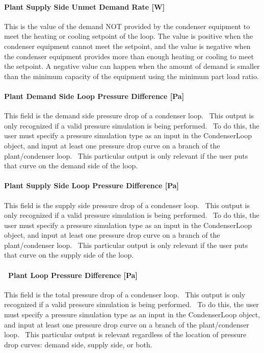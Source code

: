 \paragraph{Plant Supply Side Unmet Demand Rate {[}W{]}}\label{plant-supply-side-unmet-demand-rate-w-1}

This is the value of the demand NOT provided by the condenser equipment to meet the heating or cooling setpoint of the loop. The value is positive when the condenser equipment cannot meet the setpoint, and the value is negative when the condenser equipment provides more than enough heating or cooling to meet the setpoint. A negative value can happen when the amount of demand is smaller than the minimum capacity of the equipment using the minimum part load ratio.

\paragraph{Plant Demand Side Loop Pressure Difference {[}Pa{]}}\label{plant-demand-side-loop-pressure-difference-pa-1}

This field is the demand side pressure drop of a condenser loop.~ This output is only recognized if a valid pressure simulation is being performed.~ To do this, the user must specify a pressure simulation type as an input in the CondenserLoop object, and input at least one pressure drop curve on a branch of the plant/condenser loop.~ This particular output is only relevant if the user puts that curve on the demand side of the loop.

\paragraph{Plant Supply Side Loop Pressure Difference {[}Pa{]}}\label{plant-supply-side-loop-pressure-difference-pa-1}

This field is the supply side pressure drop of a condenser loop.~ This output is only recognized if a valid pressure simulation is being performed.~ To do this, the user must specify a pressure simulation type as an input in the CondenserLoop object, and input at least one pressure drop curve on a branch of the plant/condenser loop.~ This particular output is only relevant if the user puts that curve on the supply side of the loop.

\paragraph{~Plant Loop Pressure Difference {[}Pa{]}}\label{plant-loop-pressure-difference-pa-1}

This field is the total pressure drop of a condenser loop.~ This output is only recognized if a valid pressure simulation is being performed.~ To do this, the user must specify a pressure simulation type as an input in the CondenserLoop object, and input at least one pressure drop curve on a branch of the plant/condenser loop.~ This particular output is relevant regardless of the location of pressure drop curves: demand side, supply side, or both.